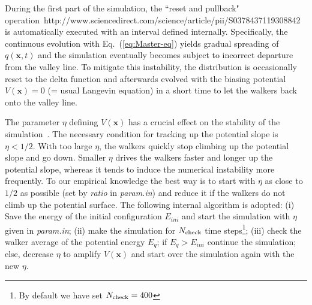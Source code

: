\documentclass[preprint,12pt]{elsarticle}
\begin{document}
During the first part of the simulation, the ``reset and pullback" operation~http://www.sciencedirect.com/science/article/pii/S0378437119308842 is automatically executed with an interval defined internally. Specifically, the continuous evolution with Eq.~(\ref{eq:Master-eq}) yields gradual spreading of $q({\bm x}, t)$ and the simulation eventually becomes subject to incorrect departure from the valley line. To mitigate this instability, the distribution is occasionally reset to the delta function and afterwards evolved with the biasing potential $V({\bm x})=0$ (= usual Langevin equation) in a short time to let the walkers back onto the valley line. 

The parameter $\eta$ defining $V({\bm x})$ has a crucial effect on the stability of the simulation~\cite{Akashi, Nagornov}. The necessary condition for tracking up the potential slope is $\eta<1/2$. With too large $\eta$, the walkers quickly stop climbing up the potential slope and go down. Smaller $\eta$ drives the walkers faster and longer up the potential slope, whereas it tends to induce the numerical instability more frequently. To our empirical knowledge the best way is to start with $\eta$ as close to $1/2$ as possible (set by {\it ratio} in {\it param.in}) and reduce it if the walkers do not climb up the potential surface. The following internal algorithm is adopted: (i) Save the energy of the initial configuration $E_{ini}$ and start the simulation with $\eta$ given in {\it param.in}; (ii) make the simulation for $N_{\rm check}$ time steps\footnote{By default we have set $N_{\rm check}=400$}; (iii) check the walker average of the potential energy $E_{q}$; if $E_{q} > E_{ini}$ continue the simulation; else, decrease  $\eta$ to amplify $V({\bm x})$ and start over the simulation again with the new $\eta$.

\end{document}
